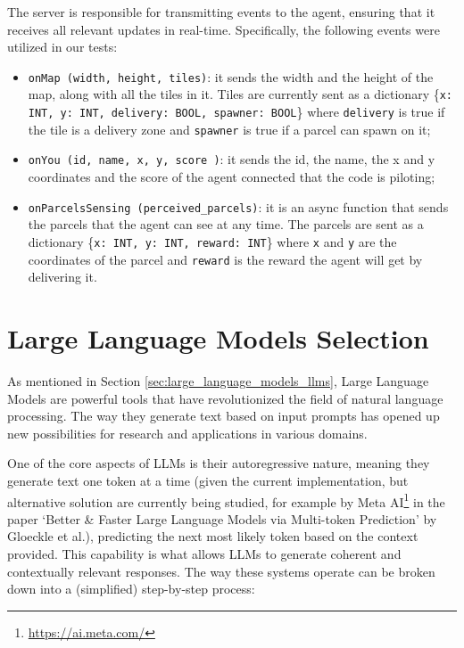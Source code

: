 The server is responsible for transmitting events to the agent, ensuring that it
receives all relevant updates in real-time. Specifically, the following events were
utilized in our tests:

\begin{itemize}
  \item \texttt{onMap\ (width, height, tiles)}: it sends the width and the height
    of the map, along with all the tiles in it. Tiles are currently sent as a dictionary
    \{\texttt{x: INT, y: INT, delivery: BOOL, spawner: BOOL}\} where \texttt{delivery}
    is true if the tile is a delivery zone and \texttt{spawner} is true if a
    parcel can spawn on it;

  \item \texttt{onYou\ (id, name, x, y, score )}: it sends the id, the name, the
    x and y coordinates and the score of the agent connected that the code is piloting;

  \item \texttt{onParcelsSensing\ (perceived\_parcels)}: it is an async function
    that sends the parcels that the agent can see at any time. The parcels are
    sent as a dictionary \{\texttt{x: INT, y: INT, reward: INT}\} where \texttt{x}
    and \texttt{y} are the coordinates of the parcel and \texttt{reward} is the
    reward the agent will get by delivering it.
\end{itemize}

\section{Large Language Models Selection}
\label{sec:llm_models}

As mentioned in Section \ref{sec:large_language_models_llms}, Large Language
Models are powerful tools that have revolutionized the field of natural language
processing. The way they generate text based on input prompts has opened up new possibilities
for research and applications in various domains.

One of the core aspects of LLMs is their autoregressive nature, meaning they
generate text one token at a time (given the current implementation, but
alternative solution are currently being studied, for example by Meta AI\footnote{\url{https://ai.meta.com/}}
in the paper `Better \& Faster Large Language Models via Multi-token Prediction'
by Gloeckle et al.\cite{gloeckle2024betterfasterlarge}), predicting the next
most likely token based on the context provided. This capability is what allows LLMs
to generate coherent and contextually relevant responses. The way these systems
operate can be broken down into a (simplified) step-by-step process:

